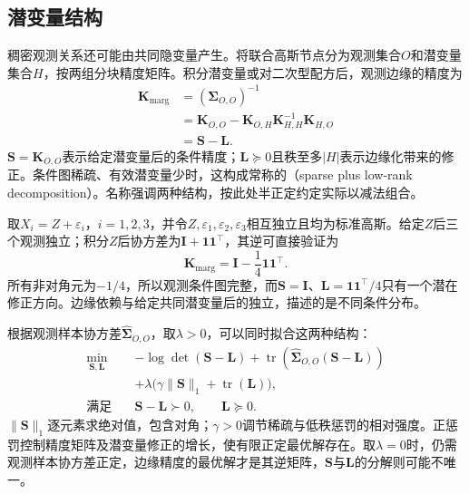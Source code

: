 \subsection{潜变量结构}
\label{sec:pgm-structure-learning-latent}

稠密观测关系还可能由共同隐变量产生。将联合高斯节点分为观测集合$O$和潜变量集合$H$，按两组分块精度矩阵。积分潜变量或对二次型配方后，观测边缘的精度为
\begin{equation}
  \begin{aligned}
    \bm{K}_{\mathrm{marg}}
      &=(\bm{\Sigma}_{O,O})^{-1}\\
      &=\bm{K}_{O,O}
        -\bm{K}_{O,H}\bm{K}_{H,H}^{-1}\bm{K}_{H,O}\\
      &=\bm{S}-\bm{L}.
  \end{aligned}
  \label{eq:pgm-structure-learning-schur}
\end{equation}
$\bm{S}=\bm{K}_{O,O}$表示给定潜变量后的条件精度；$\bm{L}\succeq0$且秩至多$|H|$表示边缘化带来的修正。条件图稀疏、有效潜变量少时，这构成常称的（sparse plus low-rank decomposition）。名称强调两种结构，按此处半正定约定实际以减法组合。

取$X_i=Z+\varepsilon_i$，$i=1,2,3$，并令$Z,\varepsilon_1,\varepsilon_2,\varepsilon_3$相互独立且均为标准高斯。给定$Z$后三个观测独立；积分$Z$后协方差为$\bm{I}+\bm{1}\bm{1}^{\top}$，其逆可直接验证为
\[
  \bm{K}_{\mathrm{marg}}
  =\bm{I}-\frac14\bm{1}\bm{1}^{\top}.
\]
所有非对角元为$-1/4$，所以观测条件图完整，而$\bm{S}=\bm{I}$、$\bm{L}=\bm{1}\bm{1}^{\top}/4$只有一个潜在修正方向。边缘依赖与给定共同潜变量后的独立，描述的是不同条件分布。

根据观测样本协方差$\widehat{\bm{\Sigma}}_{O,O}$，取$\lambda>0$，可以同时拟合这两种结构：
\begin{equation}
  \begin{aligned}
    \min_{\bm{S},\bm{L}}\quad&
      -\log\det(\bm{S}-\bm{L})
      +\operatorname{tr}\!\left(
           \widehat{\bm{\Sigma}}_{O,O}(\bm{S}-\bm{L})\right)\\
      &+\lambda\bigl(\gamma\lVert\bm{S}\rVert_1
                      +\operatorname{tr}(\bm{L})\bigr),\\
    \text{满足}\quad&\bm{S}-\bm{L}\succ0,\qquad \bm{L}\succeq0.
  \end{aligned}
  \label{eq:pgm-structure-learning-sparse-low-rank}
\end{equation}
$\lVert\bm{S}\rVert_1$逐元素求绝对值，包含对角；$\gamma>0$调节稀疏与低秩惩罚的相对强度。正惩罚控制精度矩阵及潜变量修正的增长，使有限正定最优解存在。取$\lambda=0$时，仍需观测样本协方差正定，边缘精度的最优解才是其逆矩阵，$\bm S$与$\bm L$的分解则可能不唯一。


